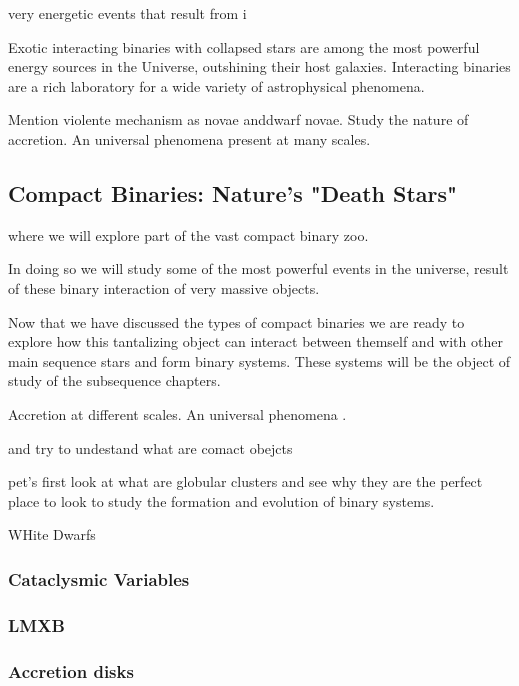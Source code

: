 very energetic events that result from i

Exotic interacting binaries with collapsed stars are among the most powerful energy sources in the Universe, outshining their host galaxies. Interacting binaries are a rich laboratory for a wide variety of astrophysical phenomena.



Mention violente mechanism as novae anddwarf novae. Study the nature of accretion. An universal phenomena present at many scales. 


\subsection[Compact Binaries]{Compact Binaries: Nature's "Death Stars"}\label{sec:cb}

where we will explore part of the vast compact binary zoo.


In doing so we will study some of the most powerful events in the universe, result of these binary interaction of very massive objects.  



Now that we have discussed the types of compact binaries we are ready to explore how this tantalizing object can interact between themself and with other main sequence stars and form binary systems. These systems will be the object of study of the subsequence chapters.  

Accretion at different scales. An universal phenomena . 



and try to undestand what are comact obejcts 

pet's first look at what are globular clusters and see why they are the perfect place to look to study the formation and evolution of binary systems. 

WHite Dwarfs

\subsubsection{Cataclysmic Variables}

\subsubsection{LMXB}


\subsubsection{Accretion disks}


